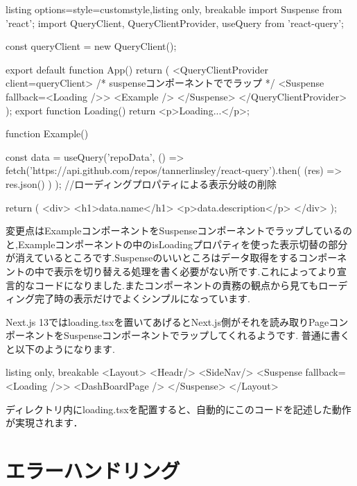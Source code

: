 \begin{tcblisting}{listing options={style=customstyle},listing only, breakable}
  import { Suspense } from 'react';
import { QueryClient, QueryClientProvider, useQuery } from 'react-query';

const queryClient = new QueryClient();

export default function App() {
  return (
    <QueryClientProvider client={queryClient}>
      {/* suspenseコンポーネントででラップ */}
      <Suspense fallback={<Loading />}>
        <Example />
      </Suspense>
    </QueryClientProvider>
  );
}
export function Loading() {
  return <p>Loading...</p>;
}

function Example() {
  const { data } = useQuery('repoData', () =>
    fetch('https://api.github.com/repos/tannerlinsley/react-query').then(
      (res) => res.json()
    )
  );
  //ローディングプロパティによる表示分岐の削除

  return (
    <div>
      <h1>{data.name}</h1>
      <p>{data.description}</p>
    </div>
  );
}

\end{tcblisting}





変更点はExampleコンポーネントをSuspenseコンポーネントでラップしているのと,Exampleコンポーネントの中のisLoadingプロパティを使った表示切替の部分が消えているところです.Suspenseのいいところはデータ取得をするコンポーネントの中で表示を切り替える処理を書く必要がない所です.これによってより宣言的なコードになりました.またコンポーネントの責務の観点から見てもローディング完了時の表示だけでよくシンプルになっています.

Next.js 13ではloading.tsxを置いてあげるとNext.js側がそれを読み取りPageコンポーネントをSuspenseコンポーネントでラップしてくれるようです.
普通に書くと以下のようになります.



\begin{tcblisting}{listing only, breakable}
  <Layout>
  <Headr/>
  <SideNav/>
  <Suspense fallback={<Loading />}>
  <DashBoardPage />
  </Suspense>
  </Layout>
\end{tcblisting}

ディレクトリ内にloading.tsxを配置すると、自動的にこのコードを記述した動作が実現されます．



\section{エラーハンドリング}

